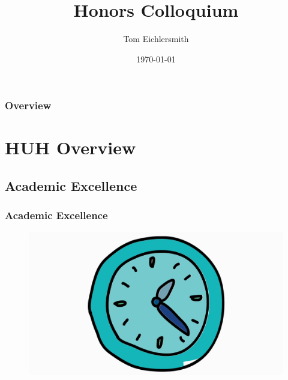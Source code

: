 \documentclass{beamer}
\title[HUH Colloquium]{Honors Colloquium} %
\author{Tom Eichlersmith}
\institute[Hamline U]
{
Hamline University \\
\medskip
\textit{teichlersmith01@hamline.edu}
}
\date{\today}
\begin{document}
\begin{frame}
\titlepage %
\end{frame}

\begin{frame}
\frametitle{Overview} %
\tableofcontents %
\end{frame}


\section{HUH Overview} 

\subsection{Academic Excellence} %

\begin{frame}
	
\frametitle{Academic Excellence}

\begin{figure}[h]
	\includegraphics[width=0.8\linewidth]{images/clock.png}
\end{figure}

\end{frame}
\end{document}

